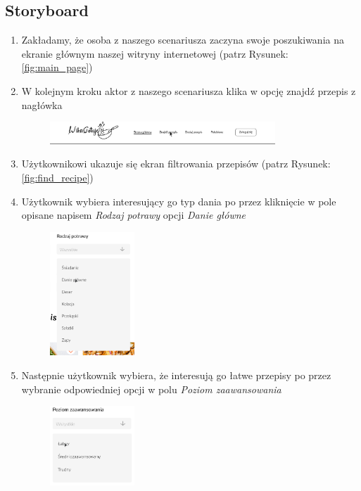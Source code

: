 \documentclass{article}
\begin{document}
\subsection{Storyboard}
\begin{enumerate}
    \item Zakładamy, że osoba z naszego scenariusza zaczyna swoje poszukiwania na ekranie głównym naszej witryny internetowej (patrz Rysunek: \ref{fig:main_page})
    \item W kolejnym kroku aktor z naszego scenariusza klika w opcję znajdź przepis z nagłówka 
        \begin{figure}[H]
            \begin{center}
                \includegraphics[width=0.8\textwidth]{images/find_recipe_step1}
            \end{center}
        \end{figure}
    \item Użytkownikowi ukazuje się ekran filtrowania przepisów (patrz Rysunek: \ref{fig:find_recipe})
    \item Użytkownik wybiera interesujący go typ dania po przez kliknięcie w pole opisane napisem \textit{Rodzaj potrawy} opcji \textit{Danie główne}
        \begin{figure}[H]
            \begin{center}
                \includegraphics[width=0.3\textwidth]{images/find_recipe_step2}
            \end{center}
        \end{figure}
    \item Następnie użytkownik wybiera, że interesują go łatwe przepisy po przez wybranie odpowiedniej opcji w polu \textit{Poziom zaawansowania}
        \begin{figure}[H]
            \begin{center}
                \includegraphics[width=0.3\textwidth]{images/find_recipe_step3}
            \end{center}
        \end{figure}


\end{enumerate}
\end{document}
